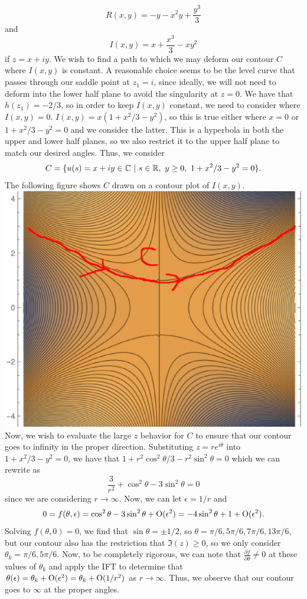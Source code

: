 \documentclass{article}
\begin{document}
\[
R(x,y)=-y-x^2y+\frac{y^3}{3}
\]
and 
\[
I(x,y)=x+\frac{x^3}{3}-xy^2
\]
if $z=x+iy$. We wish to find a path to which we may deform our contour $C$ where $I(x,y)$ is constant. A reasonable choice seems to be the level curve that passes through our saddle point at $z_1=i$, since ideally, we will not need to deform into the lower half plane to avoid the singularity at $z=0$. We have that $h(z_1)=-2/3$, so in order to keep $I(x,y)$ constant, we need to consider where $I(x,y)=0$. $I(x,y)=x(1+x^2/3-y^2)$, so this is true either where $x=0$ or $1+x^2/3-y^2=0$ and we consider the latter. This is a hyperbola in both the upper and lower half planes, so we also restrict it to the upper half plane to match our desired angles. Thus, we consider 
\[
C=\{u(s)=x+iy\in\mathbb{C} ~|~s\in\mathbb{R},~ y\geq0, ~ 1+x^2/3-y^2=0\}.
\]
The following figure shows $C$ drawn on a contour plot of $I(x,y)$.\\\includegraphics[scale=0.4]{568hw4fig1.eps}\\
Now, we wish to evaluate the large $z$ behavior for $C$ to ensure that our contour goes to infinity in the proper direction. Substituting $z=re^{i\theta}$ into $1+x^2/3-y^2=0$, we have that $1+r^2\cos^2\theta/3-r^2\sin^2\theta=0$ which we can rewrite as 
\[
\frac{3}{r^2}+\cos^2\theta-3\sin^2\theta=0
\]
since we are considering $r\to\infty$. Now, we can let $\epsilon=1/r$ and 
\[
0=f(\theta,\epsilon)=\cos^2\theta-3\sin^2\theta+\operatorname{O}(\epsilon^2)=-4\sin^2\theta+1+\operatorname{O}(\epsilon^2).
\]
Solving $f(\theta,0)=0$, we find that $\sin\theta=\pm1/2$, so $\theta=\pi/6,5\pi/6,7\pi/6,13\pi/6$, but our contour also has the restriction that $\Im(z)\geq0$, so we only consider $\theta_k=\pi/6,5\pi/6$. Now, to be completely rigorous, we can note that $\frac{\partial f}{\partial\theta}\neq0$ at these values of $\theta_k$ and apply the IFT to determine that $\theta(\epsilon)=\theta_k+\operatorname{O}(\epsilon^2)=\theta_k+\operatorname{O}(1/r^2)$ as $r\to\infty$. Thus, we observe that our contour goes to $\infty$ at the proper angles. 
\end{document}
